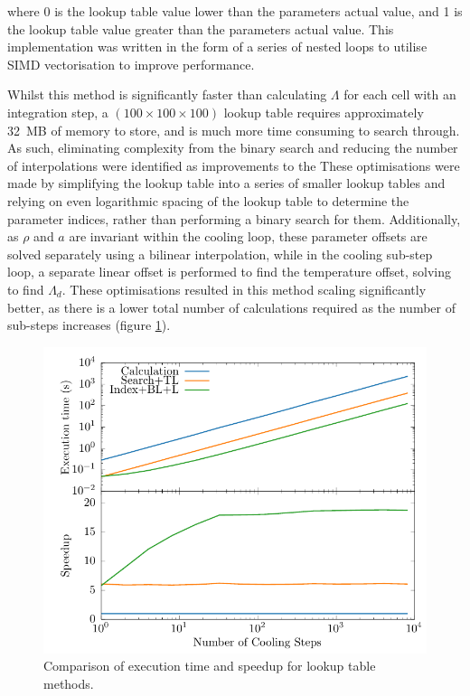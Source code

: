 \noindent
where 0 is the lookup table value lower than the parameters actual value, and 1 is the lookup table value greater than the parameters actual value.
This implementation was written in the form of a series of nested loops to utilise SIMD vectorisation to improve performance.


Whilst this method is significantly faster than calculating $\Lambda$ for each cell with an integration step, a $(100 \times 100 \times 100)$ lookup table requires approximately \SI{32}{\mega B} of memory to store, and is much more time consuming to search through.
As such, eliminating complexity from the binary search and reducing the number of interpolations were identified as improvements to the 
These optimisations were made by simplifying the lookup table into a series of smaller lookup tables and relying on even logarithmic spacing of the lookup table to determine the parameter indices, rather than performing a binary search for them.
Additionally, as $\rho$ and $a$ are invariant within the cooling loop, these parameter offsets are solved separately using a bilinear interpolation, while in the cooling sub-step loop, a separate linear offset is performed to find the temperature offset, solving to find $\Lambda_d$. These optimisations resulted in this method scaling significantly better, as there is a lower total number of calculations required as the number of sub-steps increases (figure \ref{fig:dust-opt-speedup}).

\begin{figure}
  \centering
  \includegraphics{assets/lambda-dust-speedup/lambda-dust-speedup.pdf}
  \caption[Dust lookup table methods comparison]{Comparison of execution time and speedup for lookup table methods.}
  \label{fig:dust-opt-speedup}
\end{figure}

